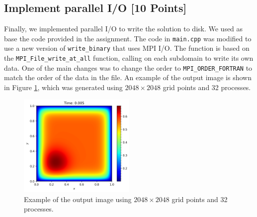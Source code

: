 \documentclass[unicode,11pt,a4paper,oneside,numbers=endperiod,openany]{scrartcl}
\begin{document}
\subsection{Implement parallel I/O [10 Points]}
Finally, we implemented parallel I/O to write the solution to disk. We used as
base the code provided in the assignment. The code in \texttt{main.cpp} was
modified to use a new version of \texttt{write\_binary} that uses MPI I/O. The
function is based on the \texttt{MPI\_File\_write\_at\_all} function, calling on
each subdomain to write its own data. One of the main changes was to change the
order to \texttt{MPI\_ORDER\_FORTRAN} to match the order of the data in the
file.
An example of the output image is shown in Figure \ref{fig:output}, which was
generated using $2048 \times 2048$ grid points and 32 processes.
\begin{figure}[h]
    \centering
    \includegraphics[width=0.5\textwidth]{../mini_app/output.png}
    \caption{Example of the output image using $2048 \times 2048$ grid points and 32 processes.}
    \label{fig:output}
\end{figure}
\end{document}
